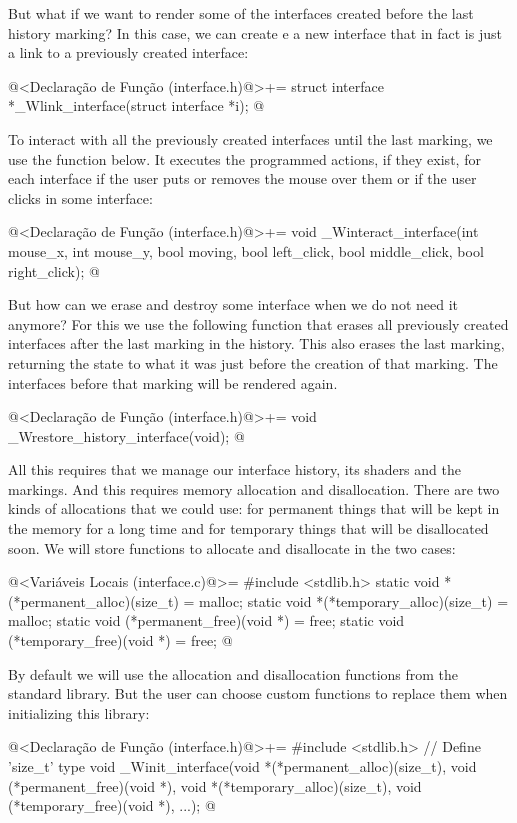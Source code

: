 But what if we want to render some of the interfaces created before
the last history marking? In this case, we can create e a new
interface that in fact is just a link to a previously created
interface:

\iniciocodigo
@<Declaração de Função (interface.h)@>+=
struct interface *_Wlink_interface(struct interface *i);
@
\fimcodigo

To interact with all the previously created interfaces until the last
marking, we use the function below. It executes the programmed
actions, if they exist, for each interface if the user puts or removes
the mouse over them or if the user clicks in some interface:

\iniciocodigo
@<Declaração de Função (interface.h)@>+=
void _Winteract_interface(int mouse_x, int mouse_y, bool moving, bool left_click,
                          bool middle_click, bool right_click);
@
\fimcodigo


But how can we erase and destroy some interface when we do not need it
anymore? For this we use the following function that erases all
previously created interfaces after the last marking in the
history. This also erases the last marking, returning the state to
what it was just before the creation of that marking. The interfaces
before that marking will be rendered again.

\iniciocodigo
@<Declaração de Função (interface.h)@>+=
void _Wrestore_history_interface(void);
@
\fimcodigo

All this requires that we manage our interface history, its shaders
and the markings.  And this requires memory allocation and
disallocation. There are two kinds of allocations that we could use:
for permanent things that will be kept in the memory for a long time
and for temporary things that will be disallocated soon. We will store
functions to allocate and disallocate in the two cases:

\iniciocodigo
@<Variáveis Locais (interface.c)@>=
#include <stdlib.h>
static void *(*permanent_alloc)(size_t) = malloc;
static void *(*temporary_alloc)(size_t) = malloc;
static void (*permanent_free)(void *) = free;
static void (*temporary_free)(void *) = free;
@
\fimcodigo

By default we will use the allocation and disallocation functions from
the standard library. But the user can choose custom functions to
replace them when initializing this library:

\iniciocodigo
@<Declaração de Função (interface.h)@>+=
#include <stdlib.h> // Define  'size_t' type
void _Winit_interface(void *(*permanent_alloc)(size_t),
                      void (*permanent_free)(void *),
                      void *(*temporary_alloc)(size_t),
                      void (*temporary_free)(void *), ...);
@
\fimcodigo

